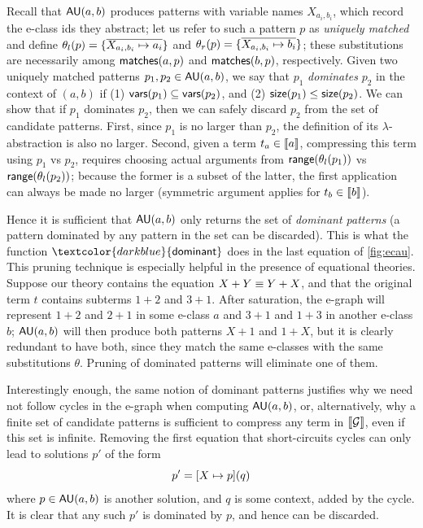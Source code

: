 %
Recall that $\mathsf{AU}(a,b)$ produces patterns
with variable names $X_{a_i,b_i}$, which record the e-class ids they abstract;
let us refer to such a pattern $p$ as \emph{uniquely matched}
and define $\theta_l(p) = \{\overline{X_{a_i,b_i} \mapsto a_i}\}$ and $\theta_r(p) = \{\overline{X_{a_i,b_i} \mapsto b_i}\}$;
these substitutions are necessarily among $\mathsf{matches}(a,p)$ and $\mathsf{matches}(b,p)$, respectively.
%
Given two uniquely matched patterns $p_1,p_2 \in \mathsf{AU}(a,b)$,
we say that $p_1$ \emph{dominates} $p_2$ in the context of $(a,b)$ if
  (1) $\mathsf{vars}(p_1) \subseteq \mathsf{vars}(p_2)$, and
  (2) $\mathsf{size}(p_1) \leq \mathsf{size}(p_2)$.
%
We can show that if $p_1$ dominates $p_2$,
then we can safely discard $p_2$ from the set of candidate patterns.
%
First, since $p_1$ is no larger than $p_2$, 
the definition of its $\lambda$-abstraction is also no larger.
%
Second, given a term $t_a\in \llbracket a \rrbracket$,
compressing this term using $p_1$ vs $p_2$,
requires choosing actual arguments from $\mathsf{range}(\theta_l(p_1))$ vs $\mathsf{range}(\theta_l(p_2))$;
because the former is a subset of the latter,
the first application can always be made no larger
(symmetric argument applies for $t_b\in \llbracket b \rrbracket$).

Hence it is sufficient that $\mathsf{AU}(a,b)$ only returns the set of \emph{dominant patterns}
(\ie a pattern dominated by any pattern in the set can be discarded).
%
This is what the function $\textcolor{darkblue}{\dominant}$ does in the last equation of \autoref{fig:ecau}.
%
This pruning technique is especially helpful in the presence of equational theories.
%
Suppose our theory contains the equation $X + Y \equiv Y + X$,
and that the original term $t$ contains subterms $1 + 2$ and $3 + 1$.
%
After saturation, the e-graph will represent $1 + 2$ and $2 + 1$ in some e-class $a$
and $3 + 1$ and $1 + 3$ in another e-class $b$;
$\mathsf{AU}(a,b)$ will then produce both patterns $X + 1$ and $1 + X$,
but it is clearly redundant to have both, 
since they match the same e-classes with the same substitutions $\theta$.
%
Pruning of dominated patterns will eliminate one of them.

%
Interestingly enough,
the same notion of dominant patterns justifies why we need not follow cycles in the e-graph when computing $\mathsf{AU}(a,b)$,
or, alternatively, why a finite set of candidate patterns is sufficient
to compress any term in $\llbracket \mathcal{G} \rrbracket$, even if this set is infinite.
%
Removing the first equation that short-circuits cycles can only lead to solutions $p'$ of the form
$$
p' = {[X \mapsto p]}({q})
$$
where $p \in \mathsf{AU}(a,b)$ is another solution, and $q$ is some context, added by the cycle.
%
It is clear that any such $p'$ is dominated by $p$, and hence can be discarded.

